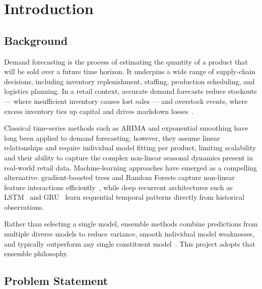 \documentclass[12pt, a4paper]{article}
\begin{document}
\newpage
\tableofcontents

\newpage
\listoffigures

\listoftables

\newpage
\section{Introduction}
\label{sec:introduction}

\subsection{Background}
\label{subsec:background}

Demand forecasting is the process of estimating the quantity of a product that will be sold
over a future time horizon. It underpins a wide range of supply-chain decisions, including
inventory replenishment, staffing, production scheduling, and logistics planning. In a retail
context, accurate demand forecasts reduce stockouts — where insufficient inventory causes
lost sales — and overstock events, where excess inventory ties up capital and drives markdown
losses~\cite{hyndman2021}.

Classical time-series methods such as ARIMA and exponential smoothing have long been applied
to demand forecasting; however, they assume linear relationships and require individual
model fitting per product, limiting scalability and their ability to capture the complex
non-linear seasonal dynamics present in real-world retail data. Machine-learning approaches
have emerged as a compelling alternative: gradient-boosted trees and Random Forests capture
non-linear feature interactions efficiently~\cite{breiman2001}, while deep recurrent
architectures such as LSTM~\cite{hochreiter1997} and GRU~\cite{cho2014} learn sequential
temporal patterns directly from historical observations.

Rather than selecting a single model, ensemble methods combine predictions from multiple
diverse models to reduce variance, smooth individual model weaknesses, and typically
outperform any single constituent model~\cite{dietterich2000}. This project adopts that
ensemble philosophy.

\subsection{Problem Statement}
\label{subsec:problem}
\end{document}
